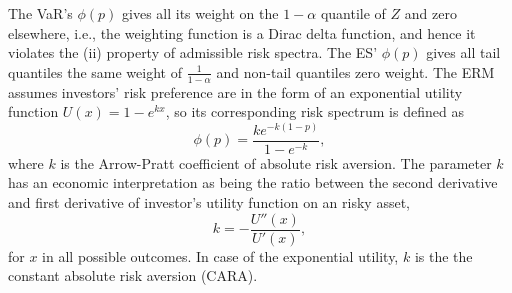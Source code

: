 The VaR's $\phi(p)$ gives all its weight on the $1-\alpha$ quantile of
$Z$ and zero elsewhere, i.e., the weighting function is a Dirac delta
function, and hence it violates the (ii) property of admissible risk
spectra.  
The ES' $\phi(p)$ gives all tail quantiles the same weight of
$\displaystyle\frac{1}{1-\alpha}$ and non-tail quantiles zero weight. 
The ERM assumes investors' risk preference are in the form of an
exponential utility function $U(x)=1-e^{kx}$, so its corresponding
risk spectrum is defined as
\begin{equation*}
  \phi(p) =\frac{k e^{-k(1-p)}}{1-e^{-k}} , \label{eq:phi}
\end{equation*}
where $k$ is the Arrow-Pratt coefficient of absolute risk aversion. 
The parameter $k$ has an economic interpretation as being the ratio
between the second derivative and first derivative 
of investor's utility function on an risky asset,
\begin{equation*}
  k = -\frac{U''(x)}{U'(x)},
\end{equation*}
for $x$ in all possible outcomes.
In case of the exponential utility, $k$ is the the constant absolute risk aversion (CARA).





